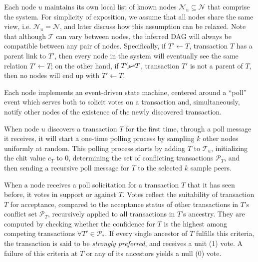 Each node $u$ maintains its own local list of known nodes $\mathcal{N}_u \subseteq \mathcal{N}$ that comprise the system.
For simplicity of exposition, we assume that all nodes share the same view, i.e. $\mathcal{N}_u = \mathcal{N}$, and later discuss how this assumption can be relaxed. 
Note that although $\mathcal{T}$ can vary between nodes, the inferred DAG will always be compatible between any pair of nodes.
Specifically, if $T' \gets T$, transaction $T$ has a parent link to $T'$, then every node in the system will eventually see the same relation $T' \gets T$; on the other hand, if $T' \cancel{\gets} T$, transaction $T'$ is not a parent of $T$, then no nodes will end up with $T' \gets T$.

Each node implements an event-driven state machine, centered around a ``poll'' event which serves both to solicit votes on a transaction and, simultaneously, notify other nodes of the existence of the newly discovered transaction.

When node $u$ discovers a transaction $T$ for the first time, through a poll message it receives, it will start a one-time polling process by sampling $k$ other nodes uniformly at random.
This polling process starts by adding $T$ to $\mathcal{T}_u$, initializing the chit value $c_T$ to $0$, determining the set of conflicting transactions $\mathcal{P}_T$, and then sending a recursive poll message for $T$ to the selected $k$ sample peers.

When a node receives a poll solicitation for a transaction $T$ that it has seen before, it votes in support or against $T$.
Votes reflect the suitability of transaction $T$ for acceptance, compared to the acceptance status of other transactions in $T$'s conflict set $\mathcal{P}_T$, recursively applied to all transactions in $T$'s ancestry.
They are computed by checking whether the confidence for $T$ is the highest among competing transactions $\forall T' \in \mathcal{P}_*$.
If every single ancestor of $T$ fulfills this criteria, the transaction is said to be \emph{strongly preferred}, and receives a unit (1) vote. A failure of this criteria at $T$ or any of its ancestors yields a null (0) vote.

